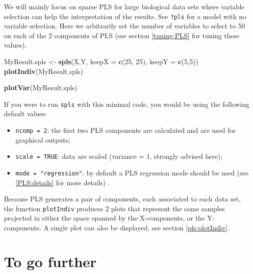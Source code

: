 \documentclass[]{book}
\newenvironment{Shaded}{\begin{snugshade}}{\end{snugshade}}
\newcommand{\DataTypeTok}[1]{\textcolor[rgb]{0.13,0.29,0.53}{#1}}
\newcommand{\DecValTok}[1]{\textcolor[rgb]{0.00,0.00,0.81}{#1}}
\newcommand{\KeywordTok}[1]{\textcolor[rgb]{0.13,0.29,0.53}{\textbf{#1}}}
\newcommand{\NormalTok}[1]{#1}
\newcommand{\StringTok}[1]{\textcolor[rgb]{0.31,0.60,0.02}{#1}}
\providecommand{\tightlist}{%
  \setlength{\itemsep}{0pt}\setlength{\parskip}{0pt}}
\begin{document}
We will mainly focus on sparse PLS for large biological data sets where variable selection can help the interpretation of the results. See \texttt{?pls} for a model with no variable selection. Here we arbitrarily set the number of variables to select to 50 on each of the 2 components of PLS (see section \ref{tuning:PLS} for tuning these values).

\begin{Shaded}
\begin{Highlighting}[]
\NormalTok{MyResult.spls <-}\StringTok{ }\KeywordTok{spls}\NormalTok{(X,Y, }\DataTypeTok{keepX =} \KeywordTok{c}\NormalTok{(}\DecValTok{25}\NormalTok{, }\DecValTok{25}\NormalTok{), }\DataTypeTok{keepY =} \KeywordTok{c}\NormalTok{(}\DecValTok{5}\NormalTok{,}\DecValTok{5}\NormalTok{))  }
\KeywordTok{plotIndiv}\NormalTok{(MyResult.spls)                                      }
\end{Highlighting}
\end{Shaded}

\begin{Shaded}
\begin{Highlighting}[]
\KeywordTok{plotVar}\NormalTok{(MyResult.spls)                                        }
\end{Highlighting}
\end{Shaded}

If you were to run \texttt{spls} with this minimal code, you would be using the following default values:

\begin{itemize}
\tightlist
\item
  \texttt{ncomp\ =\ 2}: the first two PLS components are calculated and are used for graphical outputs;
\item
  \texttt{scale\ =\ TRUE}: data are scaled (variance = 1, strongly advised here);
\item
  \texttt{mode\ =\ "regression"}: by default a PLS regression mode should be used (see \ref{PLS:details} for more details) .
\end{itemize}

Because PLS generates a pair of components, each associated to each data set, the function \texttt{plotIndiv} produces 2 plots that represent the same samples projected in either the space spanned by the X-components, or the Y-components. A single plot can also be displayed, see section \ref{pls:plotIndiv}.

\hypertarget{pls-tgf}{%
\section{To go further}\label{pls-tgf}}
\end{document}
